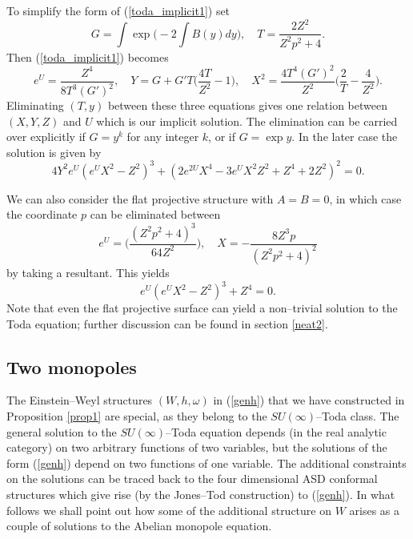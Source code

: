 To simplify the form of (\ref{toda_implicit1}) set
\[
G=\int\exp{\Big(-2\int B(y)dy\Big)}, \quad T=\frac{2Z^2}{Z^2p^2+4}.
\]
Then (\ref{toda_implicit1}) becomes
\[
e^U=\frac{Z^4}{8T^3 (G')^2}, \quad Y=G+G'T\Big(\frac{4T}{Z^2}-1\Big), \quad
X^2=\frac{4T^4(G')^2}{Z^2}\Big(\frac{2}{T}-\frac{4}{Z^2} \Big).
\]
Eliminating $(T, y)$ between these three equations gives one relation between $(X, Y, Z)$ and  $U$ which is our implicit solution.
The elimination can be carried over explicitly if $G=y^k$ for any integer $k$, or if $G=\exp{y}$. In the later case the solution is given by
\[
4Y^2e^U(e^UX^2-Z^2)^3+(2e^{2U}X^4-3e^UX^2Z^2+Z^4+2Z^2)^2=0.
\]

We can also consider the flat projective structure with $A=B=0$, in which case
the coordinate $p$ can be eliminated between
\[
e^U=\bigg(\frac{(Z^2p^2+4)^3}{64Z^2}\bigg), \quad
X=-\frac{8Z^3p}{(Z^2p^2+4)^2}
\]
by taking a resultant. This yields
\[
e^U(e^UX^2-Z^2)^3+Z^4=0.
\]
Note that even the flat projective surface can yield a non--trivial solution to the Toda equation; further discussion can be found in section \ref{neat2}.


\subsection{Two monopoles}
The Einstein--Weyl structures $(W,h,\omega)$ in (\ref{genh}) that we have constructed in Proposition \ref{prop1}
are special, as they belong to the $SU(\infty)$--Toda class. %
The general solution to the $SU(\infty)$--Toda equation depends (in the real analytic category) on 
two arbitrary functions of two variables, but the solutions of the form (\ref{genh}) depend on two functions of one variable. The additional constraints on the solutions can be traced back to the four dimensional ASD conformal structures
which give rise (by the Jones--Tod construction) to (\ref{genh}).
In what follows we shall point out how some of the additional structure on $W$ arises as a couple of solutions to the Abelian monopole equation.

